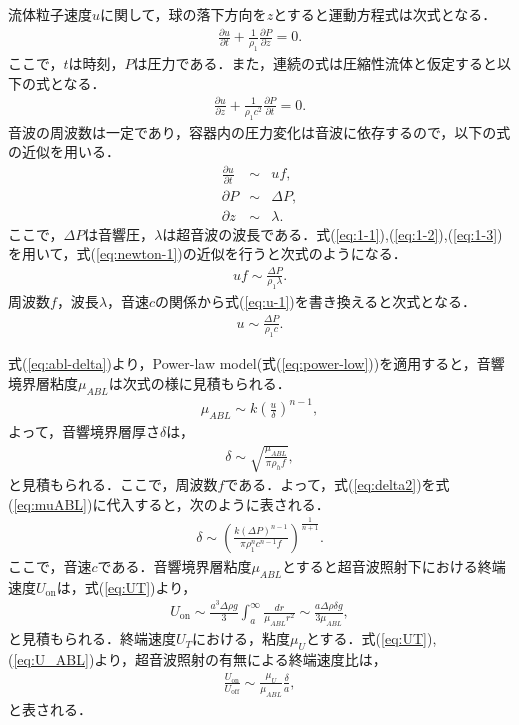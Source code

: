 流体粒子速度$u$に関して，球の落下方向を$z$とすると運動方程式は次式となる．
\begin{eqnarray}
    \frac{\partial u}{\partial t} + \frac{1}{\rho_1}\frac{\partial P}{\partial z} = 0 .
    \label{eq:newton-1}
\end{eqnarray}
ここで，$t$は時刻，$P$は圧力である．また，連続の式は圧縮性流体と仮定すると以下の式となる．
\begin{eqnarray}
    \frac{\partial u}{\partial z} + \frac{1}{\rho_1 c^2}\frac{\partial P}{\partial t} = 0 .
\end{eqnarray}
音波の周波数は一定であり，容器内の圧力変化は音波に依存するので，以下の式の近似を用いる．
\begin{eqnarray}
    \frac{\partial u}{\partial t} &\sim& uf ,\label{eq:1-1}\\
    \partial P &\sim& \Delta P ,\label{eq:1-2}\\
    \partial z &\sim& \lambda .\label{eq:1-3}
\end{eqnarray}
ここで，$\Delta P$は音響圧，$\lambda$は超音波の波長である．式(\ref{eq:1-1}),(\ref{eq:1-2}),(\ref{eq:1-3})を用いて，式(\ref{eq:newton-1})の近似を行うと次式のようになる．
\begin{eqnarray}
    uf \sim \frac{\Delta P}{\rho_1 \lambda} .
    \label{eq:u-1}
\end{eqnarray}
周波数$f$，波長$\lambda$，音速$c$の関係から式(\ref{eq:u-1})を書き換えると次式となる．
\begin{eqnarray}
    u \sim \frac{\Delta P}{\rho_1 c} .
\end{eqnarray}

式(\ref{eq:abl-delta})より，Power-law model(式(\ref{eq:power-low}))を適用すると，音響境界層粘度$\mu_{ABL}$は次式の様に見積もられる．
\begin{eqnarray}
    \mu_{ABL} \sim k\left(\frac{u}{\delta}\right)^{n-1} ,
    \label{eq:muABL}
\end{eqnarray}
よって，音響境界層厚さ$\delta$は，
\begin{eqnarray}
    \delta \sim \sqrt{\frac{\mu_{ABL}}{\pi \rho_h f}} ,
    \label{eq:delta2}
\end{eqnarray}
と見積もられる\cite{deshpande2001vibrational,wiklund2012acoustofluidics}．ここで，周波数$f$である．よって，式(\ref{eq:delta2})を式(\ref{eq:muABL})に代入すると，次のように表される．
\begin{eqnarray}
    \delta \sim \left(\frac{k\left(\Delta P\right)^{n-1}}{\pi \rho^n_1 c^{n-1} f}\right)^{\frac{1}{n+1}} .
    \label{eq:delta}
\end{eqnarray}
ここで，音速$c$である．音響境界層粘度$\mu_{ABL}$とすると超音波照射下における終端速度$U_\text{on}$は，式(\ref{eq:UT})より，
\begin{eqnarray}
    U_\text{on} \sim \frac{a^3\Delta\rho g}{3}  \int^{\infty}_{a} \frac{dr}{\mu_{ABL} r^2} \sim \frac{a\Delta \rho \delta g}{3\mu_{ABL}} ,
    \label{eq:U_ABL}
\end{eqnarray}
と見積もられる．終端速度$U_T$における，粘度$\mu_U$とする．式(\ref{eq:UT}),(\ref{eq:U_ABL})より，超音波照射の有無による終端速度比は，
\begin{eqnarray}
    \frac{U_\text{on}}{U_\text{off}} \sim \frac{\mu_U}{\mu_{ABL}}\frac{\delta}{a} ,
    \label{eq:Udiff}
\end{eqnarray}
と表される．
